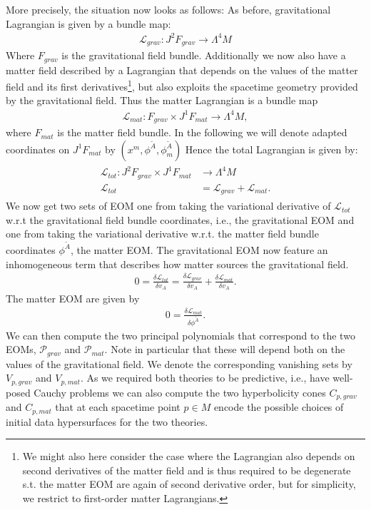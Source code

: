 More precisely, the situation now looks as follows:
As before, gravitational Lagrangian is given by a bundle map:
\begin{align}
    \mathcal{L}_{grav} : J^2F_{grav} \longrightarrow \Lambda^4M
\end{align}
Where $F_{grav}$ is the gravitational field bundle. Additionally we now also have a matter field described by a Lagrangian that depends on the values of the matter field and its first derivatives\footnote{We might also here consider the case where the Lagrangian also depends on second derivatives of the matter field and is thus required to be degenerate s.t. the matter EOM are again of second derivative order, but for simplicity, we restrict to first-order matter Lagrangians.}, but also exploits the spacetime geometry provided by the gravitational field. Thus the matter Lagrangian is a bundle map
\begin{align}
    \mathcal{L}_{mat} : F_{grav} \times J^1F_{mat} \longrightarrow \Lambda^4M,
\end{align}
where $F_{mat}$ is the matter field bundle. In the following we will denote adapted coordinates on $J^1F_{mat}$ by $(x^m,\phi^{\tilde{A}},\phi^{\tilde{A}}_m)$ Hence the total Lagrangian is given by:
\begin{align}
\begin{aligned}
    \mathcal{L}_{tot} : J^2F_{grav} \times J^1F_{mat} &\longrightarrow \Lambda^4M \\
    \mathcal{L}_{tot} &= \mathcal{L}_{grav} + \mathcal{L}_{mat}.
\end{aligned}
\end{align}
We now get two sets of EOM one from taking the variational derivative of $\mathcal{L}_{tot}$ w.r.t the gravitational field bundle coordinates, i.e., the gravitational EOM and one from taking the variational derivative w.r.t. the matter field bundle coordinates $\phi^{\tilde{A}}$, the matter EOM.
The gravitational EOM now feature an inhomogeneous term that describes how matter sources the gravitational field.
\begin{align}
    0 = \frac{\delta \mathcal{L}_{tot}}{\delta v_A} = \frac{\delta \mathcal{L}_{grav}}{\delta v_A} + \frac{\delta \mathcal{L}_{mat}}{\delta v_A}.
\end{align}
The matter EOM are given by 
\begin{align}
    0 = \frac{\delta \mathcal{L}_{mat}}{\delta \phi^{\tilde{A}}}.
\end{align}
We can then compute the two principal polynomials that correspond to the two EOMs, $\mathcal{P}_{grav}$ and $\mathcal{P}_{mat}$. Note in particular that these will depend both on the values of the gravitational field. We denote the corresponding vanishing sets by $V_{p,grav}$ and $V_{p,mat}$. As we required both theories to be predictive, i.e., have well-posed Cauchy problems we can also compute the two hyperbolicity cones $C_{p,grav}$ and $C_{p,mat}$ that at each spacetime point $p\in M$ encode the possible choices of initial data hypersurfaces for the two theories. 

